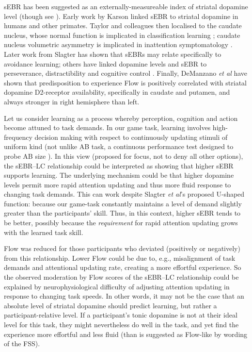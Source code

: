 \documentclass[fleqn,10pt]{wlscirep}
\begin{document}
sEBR has been suggested as an externally-measureable index of striatal dopamine level (though see \cite{dang2017spontaneous}). Early work by Karson \cite{Karson1983} linked sEBR to striatal dopamine in humans and other primates. Taylor and colleagues \cite{Taylor1999} then localised to the caudate nucleus, whose normal function is implicated in classification learning \cite{Seger2005}; caudate nucleus volumetric asymmetry is implicated in inattention symptomatology \cite{Schrimsher2002}. Later work from Slagter \cite{Slagter2015} has shown that sEBRs may relate specifically to avoidance learning; others have linked dopamine levels and sEBR to perseverance, distractibility and cognitive control \cite{Muller2007,Dreisbach2005}. Finally, DeManzano {\it et al} \cite{DeManzano2013} have shown that  predisposition to experience Flow is positively correlated with striatal dopamine D2-receptor availability, specifically in caudate and putamen, and always stronger in right hemisphere than left.

Let us consider learning as a process whereby perception, cognition and action become attuned to task demands. In our game task, learning involves high-frequency decision making with respect to continuously updating stimuli of uniform kind (not unlike AB task, a continuous performance test designed to probe AB size \cite{Slagter2012}). In this view (proposed for focus, not to deny all other options), the sEBR--LC relationship could be interpreted as showing that higher sEBR supports learning. The underlying mechanism could be that higher dopamine levels permit more rapid attention updating and thus more fluid response to changing task demands. This can work despite Slagter {\it et al}'s \cite{Slagter2012} proposed U-shaped function: because our game-task constantly maintains a level of demand slightly greater than the participants' skill. Thus, in this context, higher sEBR tends to be better, possibly because the {\it requirement} for rapid attention updating grows with the learned task skill.

Flow was reduced for those participants who deviated (positively or negatively) from this relationship. %
Lower Flow could be due to, e.g., misalignment of task demands and attentional updating rate, creating a more effortful experience. %
So the observed moderation by Flow scores of the sEBR--LC relationship could be explained by neurophysiological difficulty of adjusting attention updating in response to changing task speeds. In other words, it may not be the case that an absolute level of striatal dopamine should predict learning, but rather a participant-relative level. If a participant's tonic dopamine is not at their ideal level for this task, they might nevertheless do well in the task, and yet find the experience more effortful and less fluid (than is suggested as Flow-like by wording of the FSS).
\end{document}

